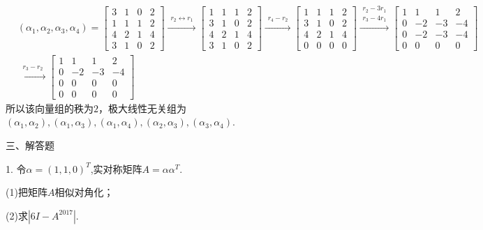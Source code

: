 \documentclass{article}
\begin{document}
\begin{jie}
\begin{align*}
&(\alpha_1,\alpha_2,\alpha_3,\alpha_4)=
\begin{bmatrix}
   3 &1 & 0 &2\\
  1 & 1 & 1&2\\
  4 & 2 & 1&4\\
   3 &1 & 0 &2
\end{bmatrix}
\xrightarrow{\substack{r_{2}\leftrightarrow r_{1}}}
{
\begin{bmatrix}
  1 & 1 & 1&2 \\
 3 &1 & 0 &2 \\
  4 & 2 & 1&4\\
   3 &1 & 0 &2
\end{bmatrix}
}
\xrightarrow{\substack{r_{4}- r_{2}}}
{
\begin{bmatrix}
  1 & 1 & 1&2 \\
 3 &1 & 0 &2 \\
  4 & 2 & 1&4\\
   0 &0 & 0 &0
\end{bmatrix}
}
\xrightarrow{\substack{r_{2}-3 r_{1}\\ r_3-4r_1}}
{
\begin{bmatrix}
  1 & 1 & 1&2 \\
 0 &-2 & -3 &-4 \\
 0 &-2 & -3 &-4\\
   0 &0 & 0 &0
\end{bmatrix}
}\\
&\xrightarrow{\substack{r_{3}-r_{2}}}
{
\begin{bmatrix}
  1 & 1 & 1&2 \\
 0 &-2 & -3 &-4 \\
0 &0 & 0 &0\\
   0 &0 & 0 &0
\end{bmatrix}
}
\end{align*}
所以该向量组的秩为$2$，极大线性无关组为$(\alpha_1,\alpha_2),(\alpha_1,\alpha_3),(\alpha_1,\alpha_4),(\alpha_2,\alpha_3),(\alpha_3,\alpha_4)$.
\end{jie}

三、解答题

1. 令$\alpha=(1,1,0)^{T}$,实对称矩阵$A=\alpha\alpha^{T}$.

(1)把矩阵$A$相似对角化；

(2)求$|6I-A^{2017}|$.
\end{document}
